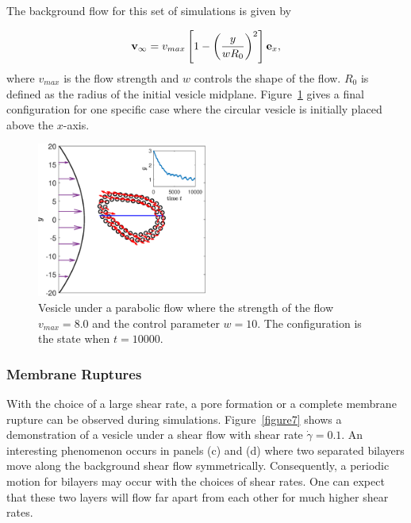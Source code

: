 \documentclass[lineno]{jfm}
\begin{document}
The background flow for this set of simulations is given by

\begin{equation}
{\bf v}_\infty = v_{max}\left[ 1 - \left( \frac{y}{wR_0}\right)^2 \right]{\bf e}_x,
\end{equation}
%
where $v_{max}$ is the flow strength and $w$ controls the shape of the flow. $R_0$ is defined as the radius of the initial vesicle midplane. Figure~\ref{figure6} gives a final configuration for one specific case where the circular vesicle is initially placed above the $x$-axis.


\begin{figure}
\centering
\includegraphics[height=2in]{parabolic.eps}
  \caption{Vesicle under a parabolic flow where the strength of the flow $v_{max}=8.0$ and the control parameter $w=10$. The configuration is the state when $t=10000$.
  }
    \label{figure6}
\end{figure}


\subsubsection{Membrane Ruptures}


With the choice of a large shear rate, a pore formation or a complete membrane rupture can be observed during simulations. Figure~\ref{figure7} shows a demonstration of a vesicle under a shear flow with shear rate $\dot\gamma=0.1$. An interesting phenomenon occurs in panels (c) and (d) where two separated bilayers move along the background shear flow symmetrically. Consequently, a periodic motion for bilayers may occur 
with the choices of shear rates. One can expect that these two layers will flow far apart from each other for much higher shear rates.
\end{document}
